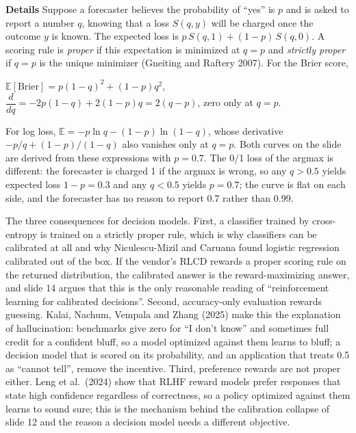 \documentclass[11pt,letterpaper]{article}
\newcommand{\para}[1]{\medskip\noindent\textbf{#1}\quad}
\newenvironment{formulas}{\begin{tcolorbox}[formulabox]}{\end{tcolorbox}}
\begin{document}
\para{Details} Suppose a forecaster believes the probability of ``yes'' is $p$ and is asked to report a number $q$, knowing that a loss $S(q,y)$ will be charged once the outcome $y$ is known. The expected loss is $p\,S(q,1)+(1-p)\,S(q,0)$. A scoring rule is \emph{proper} if this expectation is minimized at $q=p$ and \emph{strictly proper} if $q=p$ is the unique minimizer (Gneiting and Raftery 2007). For the Brier score,
\begin{formulas}
$\mathbb E[\mathrm{Brier}]=p(1-q)^2+(1-p)q^2$, \quad $\dfrac{d}{dq}=-2p(1-q)+2(1-p)q=2(q-p)$, \quad zero only at $q=p$.
\end{formulas}
For log loss, $\mathbb E=-p\ln q-(1-p)\ln(1-q)$, whose derivative $-p/q+(1-p)/(1-q)$ also vanishes only at $q=p$. Both curves on the slide are derived from these expressions with $p=0.7$. The 0/1 loss of the argmax is different: the forecaster is charged 1 if the argmax is wrong, so any $q>0.5$ yields expected loss $1-p=0.3$ and any $q<0.5$ yields $p=0.7$; the curve is flat on each side, and the forecaster has no reason to report 0.7 rather than 0.99.

The three consequences for decision models. First, a classifier trained by cross-entropy is trained on a strictly proper rule, which is why classifiers can be calibrated at all and why Niculescu-Mizil and Caruana found logistic regression calibrated out of the box. If the vendor's RLCD rewards a proper scoring rule on the returned distribution, the calibrated answer is the reward-maximizing answer, and slide 14 argues that this is the only reasonable reading of ``reinforcement learning for calibrated decisions''. Second, accuracy-only evaluation rewards guessing. Kalai, Nachum, Vempala and Zhang (2025) make this the explanation of hallucination: benchmarks give zero for ``I don't know'' and sometimes full credit for a confident bluff, so a model optimized against them learns to bluff; a decision model that is scored on its probability, and an application that treats 0.5 as ``cannot tell'', remove the incentive. Third, preference rewards are not proper either. Leng et al.\ (2024) show that RLHF reward models prefer responses that state high confidence regardless of correctness, so a policy optimized against them learns to sound sure; this is the mechanism behind the calibration collapse of slide 12 and the reason a decision model needs a different objective.
\end{document}
